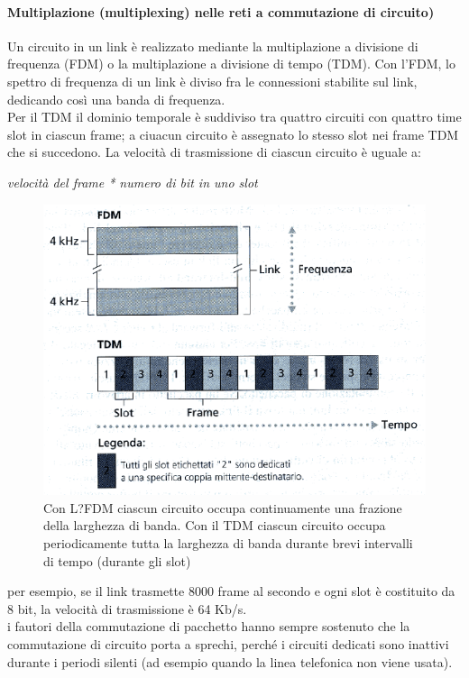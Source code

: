 \documentclass[11pt,a4paper]{article}
\begin{document}
\paragraph{Multiplazione (multiplexing) nelle reti a commutazione di circuito)}
Un circuito in un link è realizzato mediante la multiplazione a divisione di frequenza (FDM) o la multiplazione a divisione di tempo (TDM).
Con l’FDM, lo spettro di frequenza di un link è diviso fra le connessioni stabilite sul link, dedicando così una banda di frequenza. \\
Per il TDM il dominio temporale è suddiviso tra quattro circuiti con quattro time slot in ciascun frame; a ciuacun circuito è assegnato lo stesso slot nei frame TDM che si succedono. La velocità di trasmissione di ciascun circuito è uguale a:
\begin{center}
	\textit{velocità del frame * numero di bit in uno slot}
	\begin{figure}
		\includegraphics[scale=0.6]{img/003.png}
		\caption{Con L?FDM ciascun circuito occupa continuamente una frazione della larghezza di banda. Con il TDM ciascun circuito occupa periodicamente tutta la larghezza di banda durante brevi intervalli di tempo (durante gli slot)}
	\end{figure}		
\end{center}
per esempio, se il link trasmette 8000 frame al secondo e ogni slot è costituito da 8 bit, la velocità di trasmissione è 64 Kb/s. \\
i fautori della commutazione di pacchetto hanno sempre sostenuto che la commutazione di circuito porta a sprechi, perché i circuiti dedicati sono inattivi durante i periodi silenti (ad esempio quando la linea telefonica non viene usata).
\end{document}
